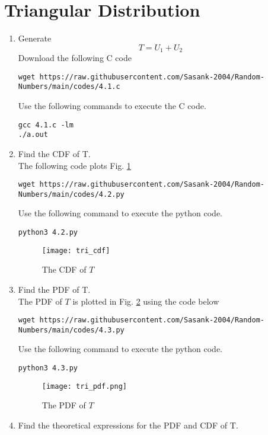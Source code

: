 \documentclass[journal,12pt,twocolumn]{IEEEtran}
\renewcommand\thesection{\arabic{section}}
\begin{document}
\section{Triangular Distribution}
\begin{enumerate}[label=\thesection.\arabic*
,ref=\thesection.\theenumi]
%
\item
Generate 
\begin{equation}
T = U_1 + U_2
\end{equation}
\solution Download the following C code 
\begin{lstlisting}
wget https://raw.githubusercontent.com/Sasank-2004/Random-Numbers/main/codes/4.1.c
\end{lstlisting}
Use the following commands to execute the C code.
\begin{lstlisting}
gcc 4.1.c -lm
./a.out 
\end{lstlisting}
\item 
Find the CDF of T.\\
\solution The following code plots Fig. \ref{fig:tri_cdf}
\begin{lstlisting}
wget https://raw.githubusercontent.com/Sasank-2004/Random-Numbers/main/codes/4.2.py
\end{lstlisting}
Use the following command to execute the python code.
\begin{lstlisting}
python3 4.2.py
\end{lstlisting}
\begin{figure}[h]
\centering
\texttt{[image: tri\_cdf]}
\caption{The CDF of $T$}
\label{fig:tri_cdf}
\end{figure}
\item 
Find the PDF of T.\\
\solution The PDF of $T$ is plotted in Fig. \ref{fig:tri_pdf} using the code below
\begin{lstlisting}
wget https://raw.githubusercontent.com/Sasank-2004/Random-Numbers/main/codes/4.3.py
\end{lstlisting}
Use the following command to execute the python code.
\begin{lstlisting}
python3 4.3.py
\end{lstlisting}
\begin{figure}[h]
\centering
\texttt{[image: tri\_pdf.png]}
\caption{The PDF of $T$}
\label{fig:tri_pdf}
\end{figure}
\item Find the theoretical expressions for the PDF and CDF of T. \\

\end{enumerate}
\end{document}
